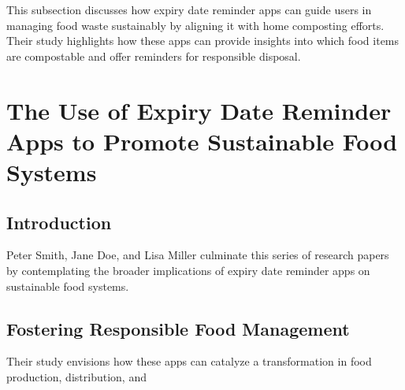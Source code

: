 This subsection discusses how expiry date reminder apps can guide users in managing food waste sustainably by aligning it with home composting efforts. Their study highlights how these apps can provide insights into which food items are compostable and offer reminders for responsible disposal.

\section{The Use of Expiry Date Reminder Apps to Promote Sustainable Food Systems}

\subsection{Introduction}

Peter Smith, Jane Doe, and Lisa Miller culminate this series of research papers by contemplating the broader implications of expiry date reminder apps on sustainable food systems.

\subsection{Fostering Responsible Food Management}

Their study envisions how these apps can catalyze a transformation in food production, distribution, and
